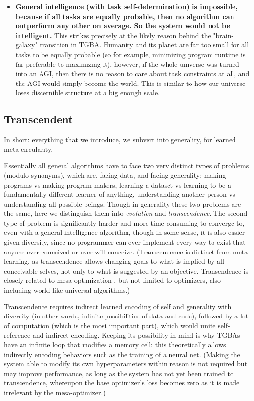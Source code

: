 \documentclass{article}
\begin{document}
\begin{itemize}
\item \textbf{General intelligence (with task self-determination) is impossible, because if all tasks are equally probable, then no algorithm can outperform any other on average. So the system would not be intelligent.} This strikes precisely at the likely reason behind the "brain-galaxy" transition in TGBA. Humanity and its planet are far too small for all tasks to be equally probable (so for example, minimizing program runtime is far preferable to maximizing it), however, if the whole universe was turned into an AGI, then there is no reason to care about task constraints at all, and the AGI would simply become the world. This is similar to how our universe loses discernible structure at a big enough scale.
\end{itemize}

\subsection{Transcendent}

In short: everything that we introduce, we subvert into generality, for learned meta-circularity.

Essentially all general algorithms have to face two very distinct types of problems (modulo synonyms), which are, facing data, and facing generality: making programs vs making program makers, learning a dataset vs learning to be a fundamentally different learner of anything, understanding another person vs understanding all possible beings. Though in generality these two problems are the same, here we distinguish them into \textit{evolution} and \textit{transcendence}. The second type of problem is significantly harder and more time-consuming to converge to, even with a general intelligence algorithm, though in some sense, it is also easier given diversity, since no programmer can ever implement every way to exist that anyone ever conceived or ever will conceive. (Transcendence is distinct from meta-learning, as transcendence allows changing goals to what is implied by all conceivable selves, not only to what is suggested by an objective. Transendence is closely related to mesa-optimization \cite{hubinger2019risks}, but not limited to optimizers, also including world-like universal algorithms.)

Transcendence requires indirect learned encoding of self and generality with diversity (in other words, infinite possibilities of data and code), followed by a lot of computation (which is the most important part), which would unite self-reference and indirect encoding. Keeping its possibility in mind is why TGBAs have an infinite loop that modifies a memory cell: this theoretically allows indirectly encoding behaviors such as the training of a neural net. (Making the system able to modify its own hyperparameters within reason is not required but may improve performance, as long as the system has not yet been trained to transcendence, whereupon the base optimizer's loss becomes zero as it is made irrelevant by the mesa-optimizer.)
\end{document}
